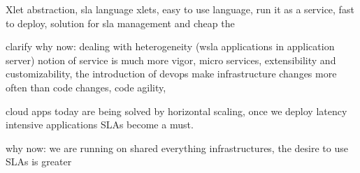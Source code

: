 Xlet abstraction, 
sla language  xlets, easy to use language, run it as a service, fast to deploy, solution for sla management and cheap the 

clarify why now: dealing with heterogeneity (wsla applications in application server) notion of service is much more vigor, micro services,  extensibility and customizability, the introduction of devops make infrastructure changes more often than code changes, code agility, 

cloud apps today are being solved by horizontal scaling, once we deploy latency intensive applications SLAs become a must. 

why now: we are running on shared everything infrastructures, the desire to use SLAs is greater






